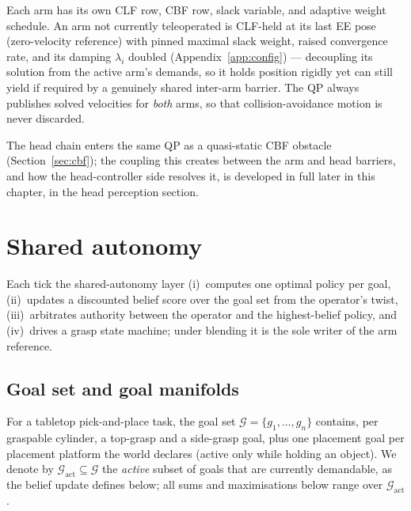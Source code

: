 Each arm has its own CLF row, CBF row, slack variable, and adaptive weight schedule. An arm not currently teleoperated is CLF-held at its last EE pose (zero-velocity reference) with pinned maximal slack weight, raised convergence rate, and its damping $\lambda_i$ doubled (Appendix~\ref{app:config}) --- decoupling its solution from the active arm's demands, so it holds position rigidly yet can still yield if required by a genuinely shared inter-arm barrier. The QP always publishes solved velocities for \emph{both} arms, so that collision-avoidance motion is never discarded.

The head chain enters the same QP as a quasi-static CBF obstacle (Section~\ref{sec:cbf}); the coupling this creates between the arm and head barriers, and how the head-controller side resolves it, is developed in full later in this chapter, in the head perception section.

\section{Shared autonomy}
\label{sec:sa}

Each tick the shared-autonomy layer (i)~computes one optimal policy per goal, (ii)~updates a discounted belief score over the goal set from the operator's twist, (iii)~arbitrates authority between the operator and the highest-belief policy, and (iv)~drives a grasp state machine; under blending it is the sole writer of the arm reference.

\subsection{Goal set and goal manifolds}
\label{sec:policies}

For a tabletop pick-and-place task, the goal set $\mathcal{G} = \{g_1,\dots,g_n\}$ contains, per graspable cylinder, a top-grasp and a side-grasp goal, plus one placement goal per placement platform the world declares (active only while holding an object). We denote by $\mathcal{G}_{\text{act}} \subseteq \mathcal{G}$ the \emph{active} subset of goals that are currently demandable, as the belief update defines below; all sums and maximisations below range over $\mathcal{G}_{\text{act}}$.

